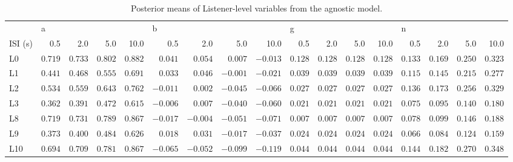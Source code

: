 \begin{table} \centering \caption{Posterior means of Listener-level variables from the agnostic model.} \label{vars} \begin{tabular}{lrrrrrrrrrrrrrrrr} \toprule {} & \multicolumn{4}{l}{a} & \multicolumn{4}{l}{b} & \multicolumn{4}{l}{g} & \multicolumn{4}{l}{n} \\ ISI (s) & 0.5 & 2.0 & 5.0 & 10.0 & 0.5 & 2.0 & 5.0 & 10.0 & 0.5 & 2.0 & 5.0 & 10.0 & 0.5 & 2.0 & 5.0 & 10.0 \\ \midrule L0 & $0.719$ & $0.733$ & $0.802$ & $0.882$ & $0.041$ & $0.054$ & $0.007$ & $-0.013$ & $0.128$ & $0.128$ & $0.128$ & $0.128$ & $0.133$ & $0.169$ & $0.250$ & $0.323$ \\ L1 & $0.441$ & $0.468$ & $0.555$ & $0.691$ & $0.033$ & $0.046$ & $-0.001$ & $-0.021$ & $0.039$ & $0.039$ & $0.039$ & $0.039$ & $0.115$ & $0.145$ & $0.215$ & $0.277$ \\ L2 & $0.534$ & $0.559$ & $0.643$ & $0.762$ & $-0.011$ & $0.002$ & $-0.045$ & $-0.066$ & $0.027$ & $0.027$ & $0.027$ & $0.027$ & $0.136$ & $0.173$ & $0.256$ & $0.329$ \\ L3 & $0.362$ & $0.391$ & $0.472$ & $0.615$ & $-0.006$ & $0.007$ & $-0.040$ & $-0.060$ & $0.021$ & $0.021$ & $0.021$ & $0.021$ & $0.075$ & $0.095$ & $0.140$ & $0.180$ \\ L8 & $0.719$ & $0.731$ & $0.789$ & $0.867$ & $-0.017$ & $-0.004$ & $-0.051$ & $-0.071$ & $0.007$ & $0.007$ & $0.007$ & $0.007$ & $0.078$ & $0.099$ & $0.146$ & $0.188$ \\ L9 & $0.373$ & $0.400$ & $0.484$ & $0.626$ & $0.018$ & $0.031$ & $-0.017$ & $-0.037$ & $0.024$ & $0.024$ & $0.024$ & $0.024$ & $0.066$ & $0.084$ & $0.124$ & $0.159$ \\ L10 & $0.694$ & $0.709$ & $0.781$ & $0.867$ & $-0.065$ & $-0.052$ & $-0.099$ & $-0.119$ & $0.044$ & $0.044$ & $0.044$ & $0.044$ & $0.144$ & $0.182$ & $0.270$ & $0.348$ \\ \bottomrule \end{tabular} \end{table}